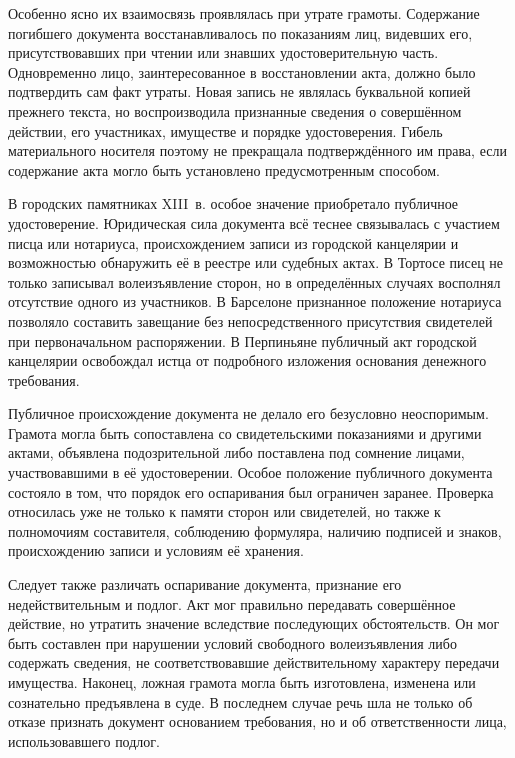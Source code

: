 Особенно ясно их взаимосвязь проявлялась при утрате грамоты. Содержание погибшего документа восстанавливалось по показаниям лиц, видевших его, присутствовавших при чтении или знавших удостоверительную часть. Одновременно лицо, заинтересованное в восстановлении акта, должно было подтвердить сам факт утраты. Новая запись не являлась буквальной копией прежнего текста, но воспроизводила признанные сведения о совершённом действии, его участниках, имуществе и порядке удостоверения. Гибель материального носителя поэтому не прекращала подтверждённого им права, если содержание акта могло быть установлено предусмотренным способом.

В городских памятниках XIII~в. особое значение приобретало публичное удостоверение. Юридическая сила документа всё теснее связывалась с участием писца или нотариуса, происхождением записи из городской канцелярии и возможностью обнаружить её в реестре или судебных актах. В Тортосе писец не только записывал волеизъявление сторон, но в определённых случаях восполнял отсутствие одного из участников. В Барселоне признанное положение нотариуса позволяло составить завещание без непосредственного присутствия свидетелей при первоначальном распоряжении. В Перпиньяне публичный акт городской канцелярии освобождал истца от подробного изложения основания денежного требования.

Публичное происхождение документа не делало его безусловно неоспоримым. Грамота могла быть сопоставлена со свидетельскими показаниями и другими актами, объявлена подозрительной либо поставлена под сомнение лицами, участвовавшими в её удостоверении. Особое положение публичного документа состояло в том, что порядок его оспаривания был ограничен заранее. Проверка относилась уже не только к памяти сторон или свидетелей, но также к полномочиям составителя, соблюдению формуляра, наличию подписей и знаков, происхождению записи и условиям её хранения.

Следует также различать оспаривание документа, признание его недействительным и подлог. Акт мог правильно передавать совершённое действие, но утратить значение вследствие последующих обстоятельств. Он мог быть составлен при нарушении условий свободного волеизъявления либо содержать сведения, не соответствовавшие действительному характеру передачи имущества. Наконец, ложная грамота могла быть изготовлена, изменена или сознательно предъявлена в суде. В последнем случае речь шла не только об отказе признать документ основанием требования, но и об ответственности лица, использовавшего подлог.

